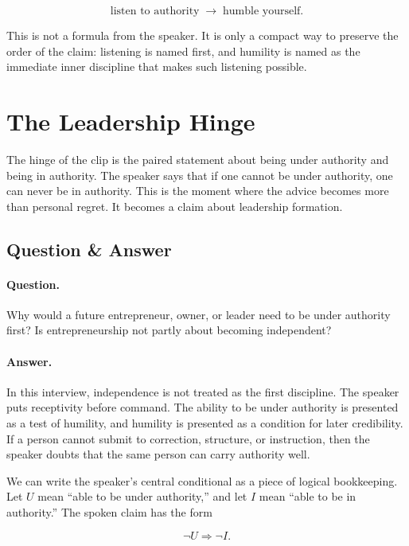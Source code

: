 \begin{equation}
\text{listen to authority}
\;\longrightarrow\;
\text{humble yourself}.
\end{equation}

This is not a formula from the speaker. It is only a compact way to preserve the order of the claim: listening is named first, and humility is named as the immediate inner discipline that makes such listening possible.

\section{The Leadership Hinge}

The hinge of the clip is the paired statement about being under authority and being in authority. The speaker says that if one cannot be under authority, one can never be in authority. This is the moment where the advice becomes more than personal regret. It becomes a claim about leadership formation.

\subsection{Question \& Answer}

\paragraph{Question.}
Why would a future entrepreneur, owner, or leader need to be under authority first? Is entrepreneurship not partly about becoming independent?

\paragraph{Answer.}
In this interview, independence is not treated as the first discipline. The speaker puts receptivity before command. The ability to be under authority is presented as a test of humility, and humility is presented as a condition for later credibility. If a person cannot submit to correction, structure, or instruction, then the speaker doubts that the same person can carry authority well.

We can write the speaker's central conditional as a piece of logical bookkeeping. Let \(U\) mean ``able to be under authority,'' and let \(I\) mean ``able to be in authority.'' The spoken claim has the form

\begin{equation}
\neg U \Longrightarrow \neg I.
\end{equation}

